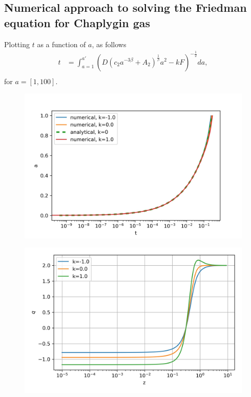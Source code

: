 \documentclass[a4paper, 11pt]{FSKH_623_Report}
\numberwithin{equation}{section}
\newcommand{\brac}[1]{\left(#1\right)}
\begin{document}
\subsection*{Numerical approach to solving the Friedman equation for Chaplygin gas}
Plotting $t$ as a function of $a$, as follows
\begin{equation}\label{eq:B9}
\begin{split}
t &= \int_{a=1}^{a'}\brac{D\brac{c_{2}a^{-3\beta }+A_{2}}^{\frac{1}{\beta}}a^{2}-kF }^{-\frac{1}{2}}da, \\
\end{split}
\end{equation}
for $a=[1,100]$.

\begin{figure}[H]
\centering
\includegraphics[scale=1]{Figures/a_ch.jpg}
\caption{ }
\end{figure}

\begin{figure}[H]
\centering
\includegraphics[scale=1]{Figures/ch_q.jpg}
\caption{}
\end{figure}
\end{document}
